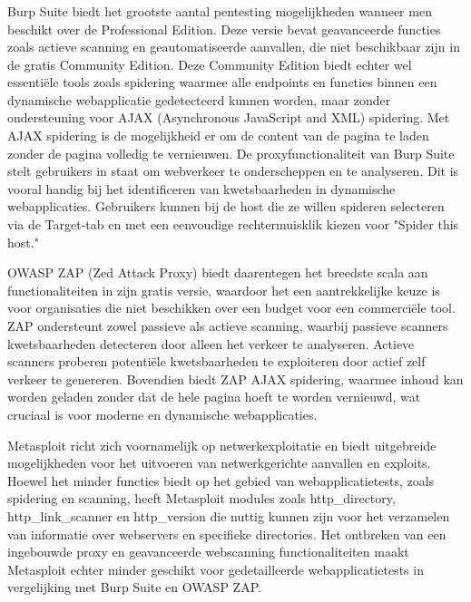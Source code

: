 \subsubsection{}
Burp Suite biedt het grootste aantal pentesting mogelijkheden wanneer men beschikt over de Professional Edition. Deze 
versie bevat geavanceerde functies zoals actieve scanning en geautomatiseerde aanvallen, die niet beschikbaar zijn in de 
gratis Community Edition. Deze Community Edition biedt echter wel essentiële tools zoals spidering waarmee alle endpoints 
en functies binnen een dynamische webapplicatie gedetecteerd kunnen worden, maar zonder ondersteuning 
voor AJAX (Asynchronous JavaScript and XML) spidering. Met AJAX spidering is de mogelijkheid er om de content van de pagina 
te laden zonder de pagina volledig te vernieuwen. De proxyfunctionaliteit van Burp Suite stelt gebruikers in staat om webverkeer te onderscheppen en te 
analyseren. Dit is vooral handig bij het identificeren van kwetsbaarheden in dynamische webapplicaties. Gebruikers kunnen bij de 
host die ze willen spideren selecteren via de Target-tab en met een eenvoudige rechtermuisklik kiezen voor "Spider this host."

OWASP ZAP (Zed Attack Proxy) biedt daarentegen het breedste scala aan functionaliteiten in zijn gratis versie, waardoor het 
een aantrekkelijke keuze is voor organisaties die niet beschikken over een budget voor een commerciële tool. ZAP ondersteunt zowel 
passieve als actieve scanning, waarbij passieve scanners kwetsbaarheden detecteren door alleen het verkeer te analyseren. 
Actieve scanners proberen potentiële kwetsbaarheden te exploiteren door actief zelf verkeer te genereren. Bovendien biedt ZAP AJAX 
spidering, waarmee inhoud kan worden geladen zonder dat de hele pagina hoeft te worden vernieuwd, wat cruciaal is voor 
moderne en dynamische webapplicaties.

Metasploit richt zich voornamelijk op netwerkexploitatie en biedt uitgebreide mogelijkheden voor het uitvoeren van netwerkgerichte 
aanvallen en exploits. Hoewel het minder functies biedt op het gebied van webapplicatietests, zoals spidering en scanning, 
heeft Metasploit modules zoals http\_directory, http\_link\_scanner en http\_version die nuttig kunnen zijn voor het verzamelen 
van informatie over webservers en specifieke directories. Het ontbreken van een ingebouwde proxy en geavanceerde 
webscanning functionaliteiten maakt Metasploit echter minder geschikt voor gedetailleerde webapplicatietests in vergelijking 
met Burp Suite en OWASP ZAP.

